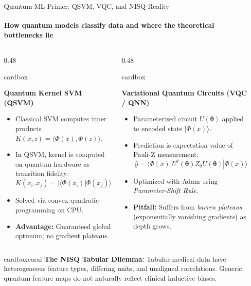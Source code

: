 \documentclass[aspectratio=169, 10pt]{beamer}
\newcommand{\cardbox}[3]{%
  \begin{beamercolorbox}[wd=\linewidth,rounded=true,sep=2.5pt]{cardbox}%
    {\bfseries\scriptsize\color{#1}#2\par}\vspace*{1pt}%
    {\footnotesize #3}%
  \end{beamercolorbox}%
}
\begin{document}
\begin{frame}{Quantum ML Primer: QSVM, VQC, and NISQ Reality}
  \framesubtitle{How quantum models classify data and where the theoretical bottlenecks lie}

  \begin{columns}[T]
    \begin{column}{0.48\textwidth}
      \cardbox{DeepPurple}{Quantum Kernel SVM (QSVM)}{
        \begin{itemize}\setlength\itemsep{1.5pt}\scriptsize
          \item Classical SVM computes inner products $K(x, z) = \langle\Phi(x), \Phi(z)\rangle$.
          \item In QSVM, kernel is computed on quantum hardware as transition fidelity:
          \[
            K(x_i, x_j) = |\langle\Phi(x_i)|\Phi(x_j)\rangle|^2
          \]
          \item Solved via convex quadratic programming on CPU.
          \item \textbf{Advantage:} Guaranteed global optimum; no gradient plateaus.
        \end{itemize}
      }
    \end{column}

    \begin{column}{0.48\textwidth}
      \cardbox{MedPurple}{Variational Quantum Circuits (VQC / QNN)}{
        \begin{itemize}\setlength\itemsep{1.5pt}\scriptsize
          \item Parameterized circuit $U(\mathbf{\theta})$ applied to encoded state $|\Phi(x)\rangle$.
          \item Prediction is expectation value of Pauli-Z measurement:
          \[
            \hat{y} = \langle\Phi(x)| U^\dagger(\mathbf{\theta}) Z_0 U(\mathbf{\theta}) |\Phi(x)\rangle
          \]
          \item Optimized with Adam using \textit{Parameter-Shift Rule}.
          \item \textbf{Pitfall:} Suffers from \textit{barren plateaus} (exponentially vanishing gradients) as depth grows.
        \end{itemize}
      }
    \end{column}
  \end{columns}

  \vspace*{3pt}
  \begin{beamercolorbox}[wd=\linewidth,rounded=true,center,sep=2pt]{cardboxcoral}
    {\small\bfseries\color{CoralRed} The NISQ Tabular Dilemma: }
    {\scriptsize Tabular medical data have heterogeneous feature types, differing units, and unaligned correlations. Generic quantum feature maps do not naturally reflect clinical inductive biases.}
  \end{beamercolorbox}
\end{frame}
\end{document}

